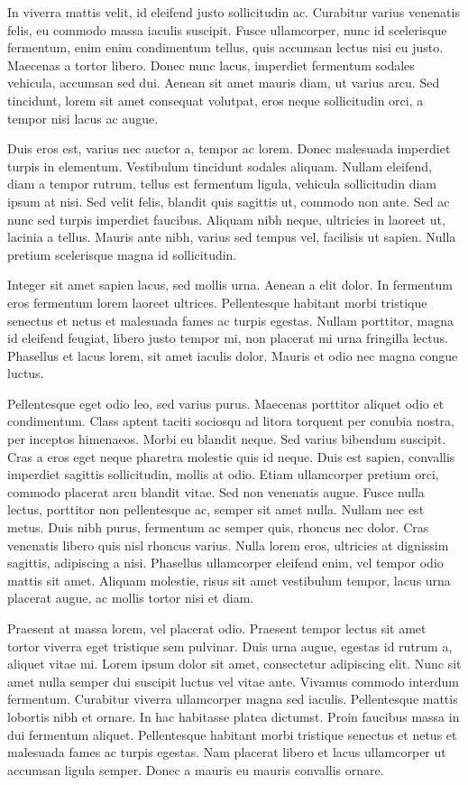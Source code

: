 \documentclass[oneside, a4paper, onecolumn, 11pt]{article}
\begin{document}
In viverra mattis velit, id eleifend justo sollicitudin ac. Curabitur varius venenatis felis, eu commodo massa iaculis suscipit. Fusce ullamcorper, nunc id scelerisque fermentum, enim enim condimentum tellus, quis accumsan lectus nisi eu justo. Maecenas a tortor libero. Donec nunc lacus, imperdiet fermentum sodales vehicula, accumsan sed dui. Aenean sit amet mauris diam, ut varius arcu. Sed tincidunt, lorem sit amet consequat volutpat, eros neque sollicitudin orci, a tempor nisi lacus ac augue.

Duis eros est, varius nec auctor a, tempor ac lorem. Donec malesuada imperdiet turpis in elementum. Vestibulum tincidunt sodales aliquam. Nullam eleifend, diam a tempor rutrum, tellus est fermentum ligula, vehicula sollicitudin diam ipsum at nisi. Sed velit felis, blandit quis sagittis ut, commodo non ante. Sed ac nunc sed turpis imperdiet faucibus. Aliquam nibh neque, ultricies in laoreet ut, lacinia a tellus. Mauris ante nibh, varius sed tempus vel, facilisis ut sapien. Nulla pretium scelerisque magna id sollicitudin.

Integer sit amet sapien lacus, sed mollis urna. Aenean a elit dolor. In fermentum eros fermentum lorem laoreet ultrices. Pellentesque habitant morbi tristique senectus et netus et malesuada fames ac turpis egestas. Nullam porttitor, magna id eleifend feugiat, libero justo tempor mi, non placerat mi urna fringilla lectus. Phasellus et lacus lorem, sit amet iaculis dolor. Mauris et odio nec magna congue luctus.

Pellentesque eget odio leo, sed varius purus. Maecenas porttitor aliquet odio et condimentum. Class aptent taciti sociosqu ad litora torquent per conubia nostra, per inceptos himenaeos. Morbi eu blandit neque. Sed varius bibendum suscipit. Cras a eros eget neque pharetra molestie quis id neque. Duis est sapien, convallis imperdiet sagittis sollicitudin, mollis at odio. Etiam ullamcorper pretium orci, commodo placerat arcu blandit vitae. Sed non venenatis augue. Fusce nulla lectus, porttitor non pellentesque ac, semper sit amet nulla. Nullam nec est metus. Duis nibh purus, fermentum ac semper quis, rhoncus nec dolor. Cras venenatis libero quis nisl rhoncus varius. Nulla lorem eros, ultricies at dignissim sagittis, adipiscing a nisi. Phasellus ullamcorper eleifend enim, vel tempor odio mattis sit amet. Aliquam molestie, risus sit amet vestibulum tempor, lacus urna placerat augue, ac mollis tortor nisi et diam.

Praesent at massa lorem, vel placerat odio. Praesent tempor lectus sit amet tortor viverra eget tristique sem pulvinar. Duis urna augue, egestas id rutrum a, aliquet vitae mi. Lorem ipsum dolor sit amet, consectetur adipiscing elit. Nunc sit amet nulla semper dui suscipit luctus vel vitae ante. Vivamus commodo interdum fermentum. Curabitur viverra ullamcorper magna sed iaculis. Pellentesque mattis lobortis nibh et ornare. In hac habitasse platea dictumst. Proin faucibus massa in dui fermentum aliquet. Pellentesque habitant morbi tristique senectus et netus et malesuada fames ac turpis egestas. Nam placerat libero et lacus ullamcorper ut accumsan ligula semper. Donec a mauris eu mauris convallis ornare.



\begin{small}

\end{small}
\end{document}
